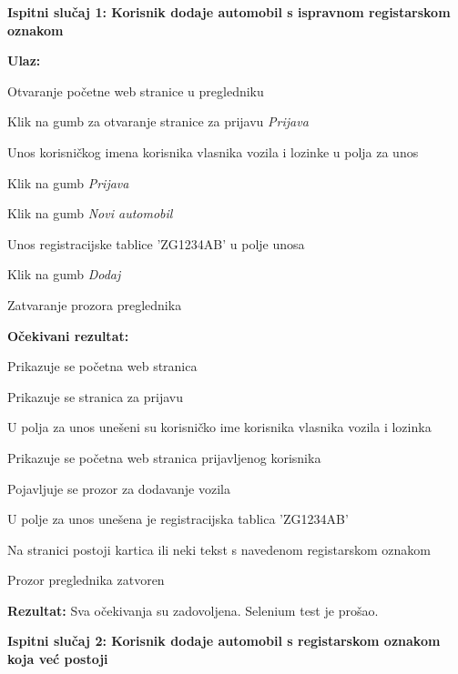 			\hfill\break
			\noindent\textbf{Ispitni slučaj 1: Korisnik dodaje automobil s ispravnom registarskom oznakom}
			
			\hfill\break
			\noindent\textbf{Ulaz:}
			
			\begin{packed_enum}
			
			\item Otvaranje početne web stranice u pregledniku
			\item Klik na gumb za otvaranje stranice za prijavu \textit{Prijava}
			\item Unos korisničkog imena korisnika vlasnika vozila i lozinke u polja za unos
			\item Klik na gumb \textit{Prijava}
			\item Klik na gumb \textit{Novi automobil}
			\item Unos registracijske tablice 'ZG1234AB' u polje unosa
			\item Klik na gumb \textit{Dodaj}
			\item Zatvaranje prozora preglednika
				
			\end{packed_enum}
			
			\noindent\textbf{Očekivani rezultat:}
			
			\begin{packed_enum}
				
				\item Prikazuje se početna web stranica
				\item Prikazuje se stranica za prijavu
				\item U polja za unos unešeni su korisničko ime korisnika vlasnika vozila i lozinka
				\item Prikazuje se početna web stranica prijavljenog korisnika
				\item Pojavljuje se prozor za dodavanje vozila
				\item U polje za unos unešena je registracijska tablica 'ZG1234AB'
				\item Na stranici postoji kartica ili neki tekst s navedenom registarskom oznakom
				\item Prozor preglednika zatvoren
				
			\end{packed_enum}
		
		
			\noindent\textbf{Rezultat:} Sva očekivanja su zadovoljena. Selenium test je prošao.
			
			\hfill\break
			\noindent\textbf{Ispitni slučaj 2: Korisnik dodaje automobil s registarskom oznakom koja već postoji}
			
